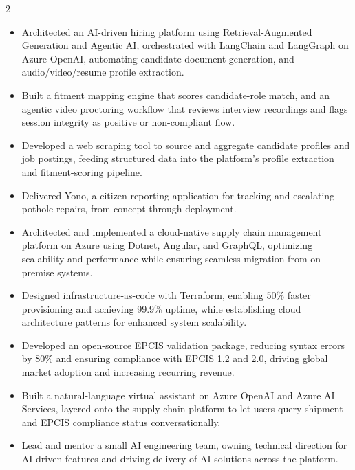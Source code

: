 \documentclass[10pt,a4paper,ragged2e,withhyper]{altacv}
\begin{document}
\begin{paracol}{2}


\ifshowai
{}
\begin{itemize}
\item Architected an AI-driven hiring platform using Retrieval-Augmented Generation and Agentic AI, orchestrated with LangChain and LangGraph on Azure OpenAI, automating candidate document generation, and audio/video/resume profile extraction.
\item Built a fitment mapping engine that scores candidate-role match, and an agentic video proctoring workflow that reviews interview recordings and flags session integrity as positive or non-compliant flow.
\item Developed a web scraping tool to source and aggregate candidate profiles and job postings, feeding structured data into the platform's profile extraction and fitment-scoring pipeline.
\item Delivered Yono, a citizen-reporting application for tracking and escalating pothole repairs, from concept through deployment.
\end{itemize}

\divider
\fi

\begin{itemize}
\item Architected and implemented a cloud-native supply chain management platform on Azure using Dotnet, Angular, and GraphQL, optimizing scalability and performance while ensuring seamless migration from on-premise systems.
\item Designed infrastructure-as-code with Terraform, enabling 50\% faster provisioning and achieving 99.9\% uptime, while establishing cloud architecture patterns for enhanced system scalability.
\item Developed an open-source EPCIS validation package, reducing syntax errors by 80\% and ensuring compliance with EPCIS 1.2 and 2.0, driving global market adoption and increasing recurring revenue.
\ifshowai
\item Built a natural-language virtual assistant on Azure OpenAI and Azure AI Services, layered onto the supply chain platform to let users query shipment and EPCIS compliance status conversationally.
\item Lead and mentor a small AI engineering team, owning technical direction for AI-driven features and driving delivery of AI solutions across the platform.
\fi
\end{itemize}


\end{paracol}
\end{document}
